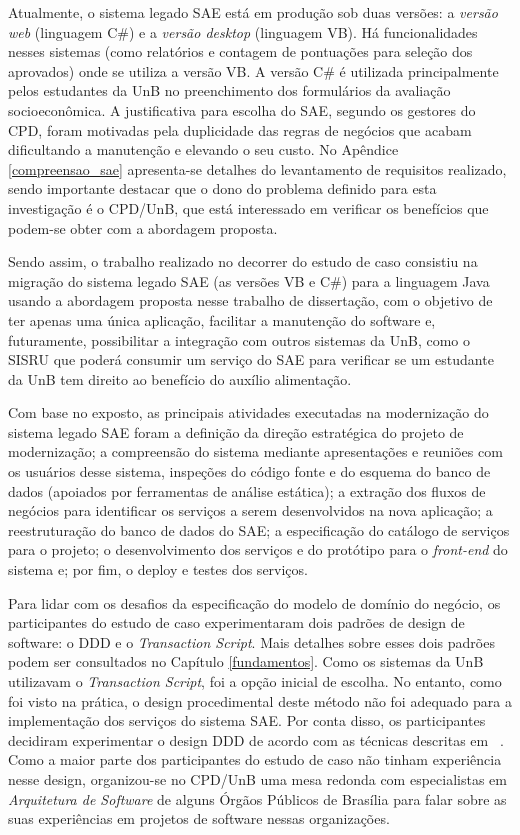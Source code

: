 Atualmente, o sistema legado \acrshort{SAE} está em produção
sob duas versões: a \emph{versão web} (linguagem C\#) e a
\emph{versão desktop} (linguagem VB). Há funcionalidades 
nesses sistemas (como relatórios e contagem de pontuações
para seleção dos aprovados) 
onde se utiliza a versão VB. A 
versão C\# é utilizada principalmente pelos estudantes da \acrshort{UnB} 
no preenchimento dos formulários da avaliação
socioeconômica. A justificativa
para escolha do \acrshort{SAE}, segundo os gestores do CPD, foram
motivadas pela duplicidade
das regras de negócios que acabam dificultando a manutenção e
elevando o seu custo. No Apêndice \ref{compreensao_sae} apresenta-se
detalhes do levantamento de requisitos realizado, sendo
importante destacar que o dono do problema definido para esta investigação
é o CPD/UnB, que está interessado em verificar os benefícios que 
podem-se obter com a abordagem proposta. 

Sendo assim, o trabalho realizado no decorrer do estudo de caso
consistiu na migração do sistema legado \acrshort{SAE}
(as versões VB e C\#) 
para a linguagem Java usando a abordagem proposta nesse
trabalho de dissertação, com o objetivo de ter apenas uma
única aplicação, facilitar a manutenção do software e, futuramente, 
possibilitar a integração com outros sistemas da \acrshort{UnB}, 
como o \acrfull{SISRU} que poderá consumir um serviço
do \acrshort{SAE} para verificar se um estudante
da \acrshort{UnB} tem direito ao benefício
do auxílio alimentação. 

Com base no exposto, as
principais atividades executadas na modernização do
sistema legado \acrshort{SAE} foram a definição da 
direção estratégica do projeto de modernização;
a compreensão do sistema mediante 
apresentações e reuniões com os usuários desse sistema, 
inspeções do código fonte e do esquema do
banco de dados (apoiados por ferramentas de análise estática); 
a extração dos fluxos de negócios para
identificar os serviços a serem desenvolvidos na nova aplicação; 
a reestruturação do banco de dados do \acrshort{SAE}; a 
especificação do catálogo de serviços para o projeto; o
desenvolvimento dos serviços e do
protótipo para o \textit{front-end} do sistema e; por fim,
o deploy e testes dos serviços.


Para lidar com os desafios da especificação do modelo
de domínio do negócio, 
os participantes do estudo de caso experimentaram
dois padrões de design de software: o \acrfull{DDD} e
o \textit{Transaction Script}. Mais detalhes sobre esses dois
padrões podem ser consultados no Capítulo \ref{fundamentos}.
Como os sistemas da \acrshort{UnB} utilizavam o \textit{Transaction Script}, 
foi a opção inicial de escolha. No entanto, 
como foi visto na prática, o design procedimental deste
método não foi adequado para a implementação dos serviços
do sistema \acrshort{SAE}. Por
conta disso, os participantes decidiram experimentar o
design \acrshort{DDD} de acordo com as técnicas
descritas em ~\cite{evans2004domain, stal2006using}. 
Como a maior parte dos participantes
do estudo de caso não tinham experiência nesse design, 
organizou-se no CPD/UnB uma mesa redonda com especialistas 
em \emph{Arquitetura de Software} de alguns Órgãos Públicos
de Brasília para falar sobre as suas experiências em projetos de
software nessas organizações.

